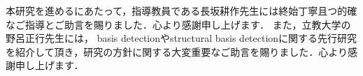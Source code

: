 本研究を進めるにあたって，指導教員である長坂耕作先生には終始丁寧且つ的確なご指導とご助言を賜りました．心より感謝申し上げます．
また，立教大学の野呂正行先生には，\groebner{} basis detectionやstructural \groebner{} basis detectionに関する先行研究を紹介して頂き，研究の方針に関する大変重要なご助言を賜りました．心より感謝申し上げます．
